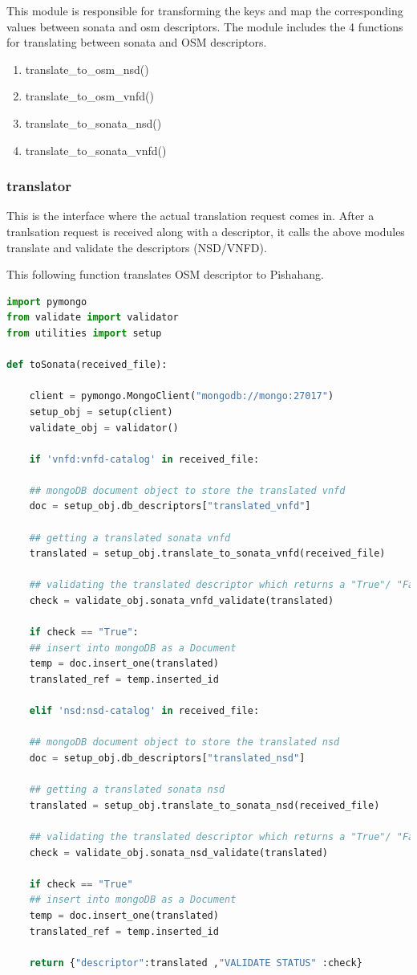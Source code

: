 This module is responsible for transforming the keys and map the corresponding values between sonata and osm descriptors. The module includes the 4 functions for translating between sonata and OSM descriptors. 
\begin{enumerate}
	\item translate\_to\_osm\_nsd()
	\item translate\_to\_osm\_vnfd()
	\item translate\_to\_sonata\_nsd()
	\item translate\_to\_sonata\_vnfd()
\end{enumerate}

\subsubsection{translator}

This is the interface where the actual translation request comes in. After a tranlsation request is received along with a descriptor, it calls the above modules translate and validate the descriptors (NSD/VNFD).

This following function translates OSM descriptor to Pishahang.
\begin{lstlisting}[language=Python]
import pymongo
from validate import validator
from utilities import setup

def toSonata(received_file):

	client = pymongo.MongoClient("mongodb://mongo:27017")
	setup_obj = setup(client)
	validate_obj = validator()
	
	if 'vnfd:vnfd-catalog' in received_file:
	
	## mongoDB document object to store the translated vnfd
	doc = setup_obj.db_descriptors["translated_vnfd"]
	
	## getting a translated sonata vnfd
	translated = setup_obj.translate_to_sonata_vnfd(received_file)
	
	## validating the translated descriptor which returns a "True"/ "False" string
	check = validate_obj.sonata_vnfd_validate(translated)
	
	if check == "True":
	## insert into mongoDB as a Document
	temp = doc.insert_one(translated)
	translated_ref = temp.inserted_id
	
	elif 'nsd:nsd-catalog' in received_file:
	
	## mongoDB document object to store the translated nsd
	doc = setup_obj.db_descriptors["translated_nsd"]
	
	## getting a translated sonata nsd
	translated = setup_obj.translate_to_sonata_nsd(received_file)
	
	## validating the translated descriptor which returns a "True"/ "False" string
	check = validate_obj.sonata_nsd_validate(translated)
	
	if check == "True"
	## insert into mongoDB as a Document
	temp = doc.insert_one(translated)
	translated_ref = temp.inserted_id
	
	return {"descriptor":translated ,"VALIDATE STATUS" :check}
\end{lstlisting}

